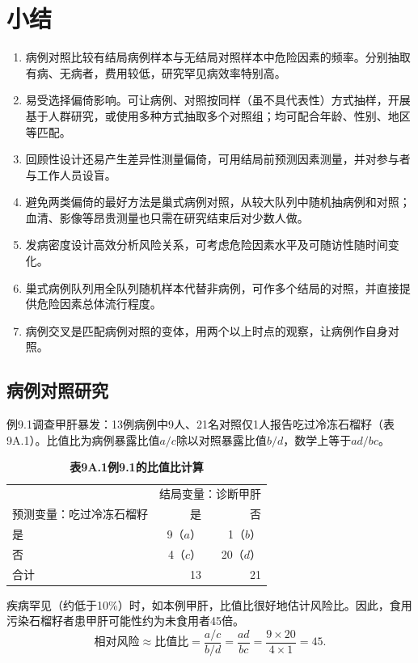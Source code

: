 \section{小结}
\begin{enumerate}
\item 病例对照比较有结局病例样本与无结局对照样本中危险因素的频率。分别抽取有病、无病者，费用较低，研究罕见病效率特别高。
\item 易受选择偏倚影响。可让病例、对照按同样（虽不具代表性）方式抽样，开展基于人群研究，或使用多种方式抽取多个对照组；均可配合年龄、性别、地区等匹配。
\item 回顾性设计还易产生差异性测量偏倚，可用结局前预测因素测量，并对参与者与工作人员设盲。
\item 避免两类偏倚的最好方法是巢式病例对照，从较大队列中随机抽病例和对照；血清、影像等昂贵测量也只需在研究结束后对少数人做。
\item 发病密度设计高效分析风险关系，可考虑危险因素水平及可随访性随时间变化。
\item 巢式病例队列用全队列随机样本代替非病例，可作多个结局的对照，并直接提供危险因素总体流行程度。
\item 病例交叉是匹配病例对照的变体，用两个以上时点的观察，让病例作自身对照。
\end{enumerate}


\subsection{病例对照研究}
例9.1调查甲肝暴发：13例病例中9人、21名对照仅1人报告吃过冷冻石榴籽（表9A.1）。比值比为病例暴露比值$a/c$除以对照暴露比值$b/d$，数学上等于$ad/bc$。
\begin{table}[htbp]\centering\small
\caption*{\textbf{表9A.1\quad 例9.1的比值比计算}}
\begin{tabular}{lrr}\toprule
&\multicolumn{2}{c}{结局变量：诊断甲肝}\\
预测变量：吃过冷冻石榴籽&是&否\\\midrule
是&9（$a$）&1（$b$）\\
否&4（$c$）&20（$d$）\\
合计&13&21\\\bottomrule
\end{tabular}
\end{table}
疾病罕见（约低于10\%）时，如本例甲肝，比值比很好地估计风险比。因此，食用污染石榴籽者患甲肝可能性约为未食用者45倍。
\[
\text{相对风险}\approx\text{比值比}=\frac{a/c}{b/d}=\frac{ad}{bc}=\frac{9\times20}{4\times1}=45.
\]

